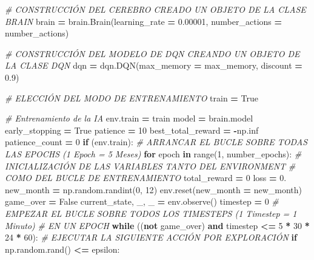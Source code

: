\documentclass[
]{book}
\newenvironment{Shaded}{\begin{snugshade}}{\end{snugshade}}
\newcommand{\BuiltInTok}[1]{#1}
\newcommand{\CommentTok}[1]{\textcolor[rgb]{0.56,0.35,0.01}{\textit{#1}}}
\newcommand{\ControlFlowTok}[1]{\textcolor[rgb]{0.13,0.29,0.53}{\textbf{#1}}}
\newcommand{\DecValTok}[1]{\textcolor[rgb]{0.00,0.00,0.81}{#1}}
\newcommand{\FloatTok}[1]{\textcolor[rgb]{0.00,0.00,0.81}{#1}}
\newcommand{\KeywordTok}[1]{\textcolor[rgb]{0.13,0.29,0.53}{\textbf{#1}}}
\newcommand{\NormalTok}[1]{#1}
\newcommand{\OperatorTok}[1]{\textcolor[rgb]{0.81,0.36,0.00}{\textbf{#1}}}
\newcommand{\VariableTok}[1]{\textcolor[rgb]{0.00,0.00,0.00}{#1}}
\begin{document}
\begin{Shaded}
\begin{Highlighting}[]
\CommentTok{\# CONSTRUCCIÓN DEL CEREBRO CREADO UN OBJETO DE LA CLASE BRAIN}
\NormalTok{brain }\OperatorTok{=}\NormalTok{ brain.Brain(learning\_rate }\OperatorTok{=} \FloatTok{0.00001}\NormalTok{, number\_actions }\OperatorTok{=}\NormalTok{ number\_actions)}

\CommentTok{\# CONSTRUCCIÓN DEL MODELO DE DQN CREANDO UN OBJETO DE LA CLASE DQN }
\NormalTok{dqn }\OperatorTok{=}\NormalTok{ dqn.DQN(max\_memory }\OperatorTok{=}\NormalTok{ max\_memory, discount }\OperatorTok{=} \FloatTok{0.9}\NormalTok{)}

\CommentTok{\# ELECCIÓN DEL MODO DE ENTRENAMIENTO}
\NormalTok{train }\OperatorTok{=} \VariableTok{True}

\CommentTok{\# Entrenamiento de la IA}
\NormalTok{env.train }\OperatorTok{=}\NormalTok{ train}
\NormalTok{model }\OperatorTok{=}\NormalTok{ brain.model}
\NormalTok{early\_stopping }\OperatorTok{=} \VariableTok{True}
\NormalTok{patience }\OperatorTok{=} \DecValTok{10}
\NormalTok{best\_total\_reward }\OperatorTok{=} \OperatorTok{{-}}\NormalTok{np.inf}
\NormalTok{patience\_count }\OperatorTok{=} \DecValTok{0}
\ControlFlowTok{if}\NormalTok{ (env.train):}
    \CommentTok{\# ARRANCAR EL BUCLE SOBRE TODAS LAS EPOCHS (1 Epoch = 5 Meses)}
    \ControlFlowTok{for}\NormalTok{ epoch }\KeywordTok{in} \BuiltInTok{range}\NormalTok{(}\DecValTok{1}\NormalTok{, number\_epochs):}
        \CommentTok{\# INICIALIZACIÓN DE LAS VARIABLES TANTO DEL ENVIRONMENT }
        \CommentTok{\# COMO DEL BUCLE DE ENTRENAMIENTO}
\NormalTok{        total\_reward }\OperatorTok{=} \DecValTok{0}
\NormalTok{        loss }\OperatorTok{=} \FloatTok{0.}
\NormalTok{        new\_month }\OperatorTok{=}\NormalTok{ np.random.randint(}\DecValTok{0}\NormalTok{, }\DecValTok{12}\NormalTok{)}
\NormalTok{        env.reset(new\_month }\OperatorTok{=}\NormalTok{ new\_month)}
\NormalTok{        game\_over }\OperatorTok{=} \VariableTok{False}
\NormalTok{        current\_state, \_, \_ }\OperatorTok{=}\NormalTok{ env.observe()}
\NormalTok{        timestep }\OperatorTok{=} \DecValTok{0}
        \CommentTok{\# EMPEZAR EL BUCLE SOBRE TODOS LOS TIMESTEPS (1 Timestep = 1 Minuto) }
        \CommentTok{\# EN UN EPOCH}
        \ControlFlowTok{while}\NormalTok{ ((}\KeywordTok{not}\NormalTok{ game\_over) }\KeywordTok{and}\NormalTok{ timestep }\OperatorTok{\textless{}=} \DecValTok{5} \OperatorTok{*} \DecValTok{30} \OperatorTok{*} \DecValTok{24} \OperatorTok{*} \DecValTok{60}\NormalTok{):}
            \CommentTok{\# EJECUTAR LA SIGUIENTE ACCIÓN POR EXPLORACIÓN}
            \ControlFlowTok{if}\NormalTok{ np.random.rand() }\OperatorTok{\textless{}=}\NormalTok{ epsilon:}

\end{Highlighting}
\end{Shaded}
\end{document}

